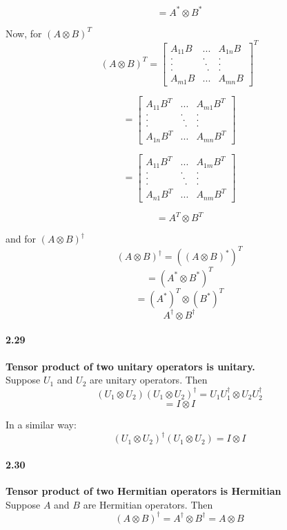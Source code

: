 $$ =A^* \otimes B^*$$

Now, for $(A\otimes B)^T$
$$ (A \otimes B)^T = \begin{bmatrix}
    A_{11}B & ... & A_{1n}B \\
    . & . & . \\
    . & \ . & . \\
    . & \ \ . & . \\
    A_{m1}B & ... & A_{m n}B
\end{bmatrix}^T$$

$$ = \begin{bmatrix}
    A_{11}B^T & ... & A_{m1}B^T \\
    . & . & . \\
    . & \ . & . \\
    . & \ \ . & . \\
    A_{1n}B^T & ... & A_{m n}B^T
\end{bmatrix} $$

$$ = \begin{bmatrix}
    A_{11}B^T & ... & A_{1m}B^T \\
    . & . & . \\
    . & \ . & . \\
    . & \ \ . & . \\
    A_{n1}B^T & ... & A_{n m}B^T
\end{bmatrix} $$

$$ =A^T \otimes B^T$$

and for $(A\otimes B)^{\dagger}$
$$(A \otimes B)^{\dagger} = ((A\otimes B)^*)^T$$
$$ = (A^* \otimes B^*)^T$$
$$ = (A^*)^T \otimes (B^*)^T$$
$$ A^{\dagger} \otimes B^{\dagger}$$

\paragraph{2.29} \textbf{Tensor product of two unitary operators is unitary.
}%
\\
Suppose $U_1$ and $U_2$ are unitary operators. Then
$$ (U_1 \otimes U_2)(U_1 \otimes U_2)^{\dagger} = U_1 U_1^{\dagger} \otimes U_2 U_2^{\dagger}$$
$$ = I \otimes I$$

In a similar way:
$$ (U_1 \otimes U_2)^{\dagger} (U_1 \otimes U_2) = I\otimes I$$


\paragraph{2.30} \textbf{ Tensor product of two Hermitian operators is Hermitian}%
\\
Suppose $A$ and $B$ are Hermitian operators. Then 
$$ ( A \otimes B)^{\dagger} = A^{\dagger} \otimes B^{\dagger} = A \otimes B$$

